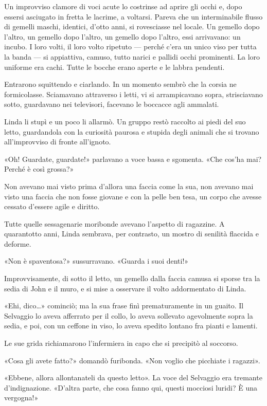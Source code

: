 \documentclass[
a5paper, %
10pt, %
twoside, 
onecolumn, %
openany, %
]{memoir}
\begin{document}
Un improvviso clamore di voci acute lo costrinse ad aprire gli occhi e, dopo essersi asciugato in fretta le lacrime, a voltarsi. Pareva che un interminabile flusso di gemelli maschi, identici, d’otto anni, si rovesciasse nel locale. Un gemello dopo l’altro, un gemello dopo l’altro, un gemello dopo l’altro, essi arrivavano: un incubo. I loro volti, il loro volto ripetuto — perché c’era un unico viso per tutta la banda — si appiattiva, camuso, tutto narici e pallidi occhi prominenti. La loro uniforme era cachi. Tutte le bocche erano aperte e le labbra pendenti.

Entrarono squittendo e ciarlando. In un momento sembrò che la corsia ne formicolasse. Sciamavano attraverso i letti, vi si arrampicavano sopra, strisciavano sotto, guardavano nei televisori, facevano le boccacce agli ammalati.

Linda li stupì e un poco li allarmò. Un gruppo restò raccolto ai piedi del suo letto, guardandola con la curiosità paurosa e stupida degli animali che si trovano all’improvviso di fronte all’ignoto.

«Oh! Guardate, guardate!» parlavano a voce bassa e sgomenta. «Che cos’ha mai? Perché è così grossa?»

Non avevano mai visto prima d’allora una faccia come la sua, non avevano mai visto una faccia che non fosse giovane e con la pelle ben tesa, un corpo che avesse cessato d’essere agile e diritto.

Tutte quelle sessagenarie moribonde avevano l’aspetto di ragazzine. A quarantotto anni, Linda sembrava, per contrasto, un mostro di senilità flaccida e deforme.

«Non è spaventosa?» sussurravano. «Guarda i suoi denti!»

Improvvisamente, di sotto il letto, un gemello dalla faccia camusa si sporse tra la sedia di John e il muro, e si mise a osservare il volto addormentato di Linda.

«Ehi, dico…» cominciò; ma la sua frase finì prematuramente in un guaito. Il Selvaggio lo aveva afferrato per il collo, lo aveva sollevato agevolmente sopra la sedia, e poi, con un ceffone in viso, lo aveva spedito lontano fra pianti e lamenti.

Le sue grida richiamarono l’infermiera in capo che si precipitò al soccorso.

«Cosa gli avete fatto?» domandò furibonda. «Non voglio che picchiate i ragazzi».

«Ebbene, allora allontanateli da questo letto». La voce del Selvaggio era tremante d’indignazione. «D’altra parte, che cosa fanno qui, questi mocciosi luridi? È una vergogna!»
\end{document}
